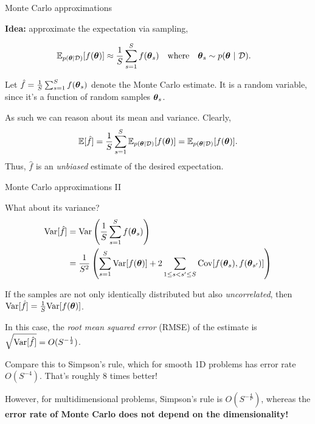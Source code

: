 \documentclass[aspectratio=169]{beamer}
\begin{document}
\begin{frame}{Monte Carlo approximations}

\textbf{Idea:} approximate the expectation via sampling,

\begin{align}
    \mathbb{E}_{p(\boldsymbol{\theta} | \mathcal{D})}[f(\boldsymbol{\theta})] &\approx \frac{1}{S} \sum_{s=1}^S f(\boldsymbol{\theta}_s) 
    \quad \text{where} \quad
    \boldsymbol{\theta}_s \sim p(\boldsymbol{\theta} ~\vert~ \mathcal{D}).
\end{align}

Let $\hat{f} = \frac{1}{S} \sum_{s=1}^S f(\boldsymbol{\theta}_s)$ denote the Monte Carlo estimate. It is a random variable, since it's a function of random samples $\boldsymbol{\theta}_s$. 

As such we can reason about its mean and variance. Clearly,
\begin{align}
    \mathbb{E}[\hat{f}] = \frac{1}{S} \sum_{s=1}^S \mathbb{E}_{p(\boldsymbol{\theta} | \mathcal{D})}[f(\boldsymbol{\theta})] = \mathbb{E}_{p(\boldsymbol{\theta} | \mathcal{D})}[f(\boldsymbol{\theta})].
\end{align}
Thus, $\hat{f}$ is an \emph{unbiased} estimate of the desired expectation.

\end{frame}

\begin{frame}{Monte Carlo approximations II}

What about its variance?
\begin{align}
    \textrm{Var}[\hat{f}] 
    &= \textrm{Var} \left(\frac{1}{S} \sum_{s=1}^S f(\boldsymbol{\theta}_s) \right) \\
    &= \frac{1}{S^2} \left( \sum_{s=1}^S \textrm{Var}[f(\boldsymbol{\theta})] + 2 \sum_{1 \leq s < s' \leq S} \mathrm{Cov} [f(\boldsymbol{\theta}_s),  f(\boldsymbol{\theta}_{s'})] \right)
\end{align}

If the samples are not only identically distributed but also \emph{uncorrelated}, then~$\textrm{Var}[\hat{f}] = \frac{1}{S} \textrm{Var}[f(\boldsymbol{\theta})]$.

In this case, the \emph{root mean squared error} (RMSE) of the estimate is $\sqrt{\textrm{Var}[\hat{f}]} = O(S^{-\frac{1}{2}})$.

Compare this to Simpson's rule, which for smooth 1D problems has error rate~$O(S^{-4})$. That's roughly 8 times better!

However, for multidimensional problems, Simpson's rule is $O(S^{-\frac{4}{P}})$, whereas the \textbf{error rate of Monte Carlo does not depend on the dimensionality!}

\end{frame}
\end{document}
